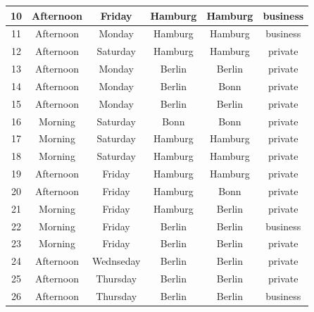 \documentclass[a4paper,12pt]{article}
\begin{document}
\begin{spacing}{1.5}
\begin{table}[h]
\begin{tabular}{|c|c|c|c|c|c|}
10         & Afternoon           & Friday              & Hamburg          & Hamburg       & business      \\\hline
11         & Afternoon           & Monday              & Hamburg          & Hamburg       & business      \\\hline
12         & Afternoon           & Saturday            & Hamburg          & Hamburg       & private       \\\hline
13         & Afternoon           & Monday              & Berlin           & Berlin        & private       \\\hline
14         & Afternoon           & Monday              & Berlin           & Bonn          & private       \\\hline
15         & Afternoon           & Monday              & Berlin           & Berlin        & private       \\\hline
16         & Morning             & Saturday            & Bonn             & Bonn          & private       \\\hline
17         & Morning             & Saturday            & Hamburg          & Hamburg       & private       \\\hline
18         & Morning             & Saturday            & Hamburg          & Hamburg       & private       \\\hline
19         & Afternoon           & Friday              & Hamburg          & Hamburg       & private       \\\hline
20         & Afternoon           & Friday              & Hamburg          & Bonn          & private       \\\hline
21         & Morning             & Friday              & Hamburg          & Berlin        & private       \\\hline
22         & Morning             & Friday              & Berlin           & Berlin        & business      \\\hline
23         & Morning             & Friday              & Berlin           & Berlin        & private       \\\hline
24         & Afternoon           & Wednseday           & Berlin           & Berlin        & private       \\\hline
25         & Afternoon           & Thursday            & Berlin           & Berlin        & private       \\\hline
26         & Afternoon           & Thursday            & Berlin           & Berlin        & business      \\\hline

\end{tabular}
\end{table}
\end{spacing}
\end{document}
